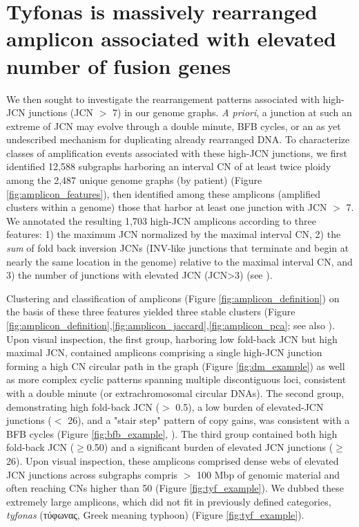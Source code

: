 \documentclass[phd,tocprelim]{cornell}
\begin{document}
\section{Tyfonas is massively rearranged amplicon associated with elevated number of fusion genes}
We then sought to investigate the rearrangement patterns associated with high-JCN junctions (JCN $>$ 7) in our genome graphs.  \textit{A priori}, a junction at such an extreme of JCN may evolve through a double minute, BFB cycles, or an as yet undescribed mechanism for duplicating already rearranged DNA. To characterize classes of  amplification events associated with these high-JCN junctions, we first identified 12,588 subgraphs harboring an interval CN of at least twice ploidy among the 2,487 unique genome graphs (by patient) (Figure \ref{fig:amplicon_features}), then identified among these amplicons (amplified clusters within a genome) those that harbor at least one junction with JCN $>$ 7.  We annotated the resulting 1,703 high-JCN amplicons according to three features: 1) the maximum JCN normalized by the maximal interval CN, 2) the \textit{sum} of fold back inversion JCNs (INV-like junctions that terminate and begin at nearly the same location in the genome) relative to the maximal interval CN, and 3) the number of junctions with elevated JCN (JCN>3) (see ).

Clustering and classification of amplicons (Figure \ref{fig:amplicon_definition}) on the basis of these three features yielded three stable clusters (Figure \ref{fig:amplicon_definition},\ref{fig:amplicon_jaccard},\ref{fig:amplicon_pca}; see also ).  Upon visual inspection, the first group, harboring low fold-back JCN but high maximal JCN, contained amplicons comprising a single high-JCN junction forming a high CN circular path in the graph (Figure \ref{fig:dm_example}) as well as more complex cyclic patterns spanning multiple discontiguous loci, consistent with a double minute (or extrachromosomal circular DNAs).  The second group, demonstrating high fold-back JCN ($>$ 0.5), a low burden of elevated-JCN junctions ($<$ 26), and a "stair step" pattern of copy gains, was consistent with a BFB cycles (Figure \ref{fig:bfb_example}, \cite{Zakov:2013cm,McClintock1939-oi}). The third group contained both high fold-back JCN ($\geq$0.50) and a significant burden of elevated JCN junctions ($\geq$26).  Upon visual inspection, these amplicons comprised dense webs of elevated  JCN junctions across subgraphs compris $>$ 100 Mbp of genomic material and often reaching CNs higher than 50 (Figure \ref{fig:tyf_example}).  We dubbed these extremely large amplicons, which did not fit in previously defined categories, \textit{tyfonas} (τύφωνας, Greek meaning typhoon) (Figure \ref{fig:tyf_example}).
\end{document}
